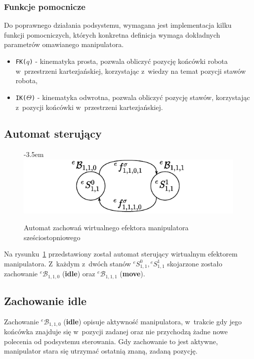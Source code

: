 \subsubsection{Funkcje pomocnicze}
Do poprawnego działania podsystemu, wymagana jest implementacja kilku funkcji pomocniczych, których konkretna definicja wymaga dokładnych parametrów omawianego manipulatora.

\begin{itemize}
    \item \texttt{FK($q$)} - kinematyka prosta, pozwala obliczyć pozycję końcówki robota w~przestrzeni kartezjańskiej, korzystając z~wiedzy na temat pozycji stawów robota,
    \item \texttt{IK($\Theta$)} - kinematyka odwrotna, pozwala obliczyć pozycję stawów, korzystając z~pozycji końcówki w~przestrzeni kartezjańskiej.
\end{itemize}

\subsection{Automat sterujący}
\begin{figure}[ht]
    \leftskip-3.5em
    \includegraphics[width=1.3\columnwidth]{figures/ISR-ve-manip-behaviours.pdf}
    \caption{Automat zachowań wirtualnego efektora manipulatora sześciostopniowego}
    \label{fig:zachowania-ve-manip}
\end{figure}

Na rysunku~\ref{fig:zachowania-ve-manip} przedstawiony został automat sterujący wirtualnym efektorem manipulatora. Z~każdym z~dwóch stanów $ {}^{e}S_{1,1}^0,  {}^{e}S_{1,1}^1$ skojarzone zostało zachowanie ${}^{e}\mathcal{B}_{1,1,0}$ (\textbf{idle}) oraz ${}^{e}\mathcal{B}_{1,1,1}$ (\textbf{move}). 

\subsection{Zachowanie idle}
\label{subsec:ve-manip-idle}

Zachowanie ${}^{e}\mathcal{B}_{1,1,0}$ (\textbf{idle}) opisuje aktywność manipulatora, w~trakcie gdy jego końcówka znajduje się w~pozycji zadanej oraz nie przychodzą żadne nowe polecenia od podsystemu sterowania. Gdy zachowanie to jest aktywne, manipulator stara się utrzymać ostatnią znaną, zadaną pozycję. 


